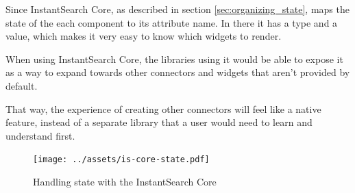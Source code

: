 Since InstantSearch Core, as described in section \ref{sec:organizing_state}, maps the state of the each component to its \gls{attribute} name. In there it has a type and a value, which makes it very easy to know which widgets to render.

When using InstantSearch Core, the libraries using it would be able to expose it as a way to expand towards other connectors and widgets that aren't provided by default.

That way, the experience of creating other connectors will feel like a native feature, instead of a separate \gls{library} that a user would need to learn and understand first.

\begin{figure}[H]
  \centering
  \texttt{[image: ../assets/is-core-state.pdf]}
  \caption{Handling state with the InstantSearch Core}
  \label{figure:is-core-state}
\end{figure} %


